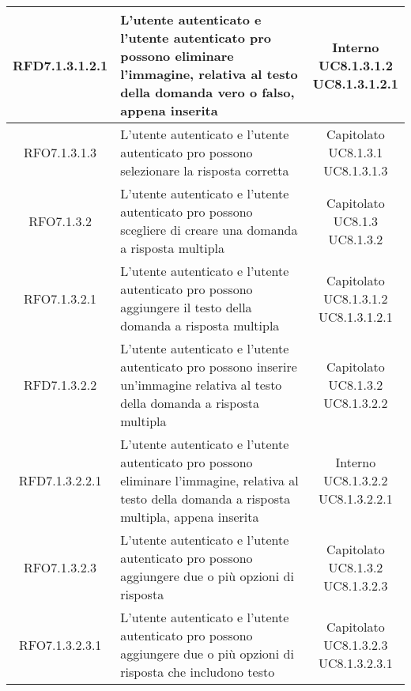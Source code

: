 \begin{longtable}{|c|>{\centering}m{7cm}|c|}
			 \hypertarget{{RFD7.1.3.1.2.1}}{{RFD7.1.3.1.2.1}} & L’utente autenticato e l'utente autenticato pro possono eliminare l’immagine, relativa al testo della domanda vero o falso, appena inserita & \makecell{Interno\\ UC8.1.3.1.2 \\UC8.1.3.1.2.1 } \\ \hline
			 \hypertarget{{RFO7.1.3.1.3}}{{RFO7.1.3.1.3}} & L’utente autenticato e l'utente autenticato pro possono selezionare la risposta corretta  & \makecell{Capitolato\\ UC8.1.3.1 \\UC8.1.3.1.3 } \\ \hline
			 \hypertarget{{RFO7.1.3.2}}{{RFO7.1.3.2}} & L’utente autenticato e l’utente autenticato pro possono scegliere di creare una domanda a risposta multipla & \makecell{Capitolato\\ UC8.1.3 \\UC8.1.3.2 } \\ \hline
			 \hypertarget{{RFO7.1.3.2.1}}{{RFO7.1.3.2.1}} & L’utente autenticato e l'utente autenticato pro possono aggiungere il testo della domanda a risposta multipla  & \makecell{Capitolato\\ UC8.1.3.1.2 \\UC8.1.3.1.2.1 } \\ \hline
			 \hypertarget{{RFD7.1.3.2.2}}{{RFD7.1.3.2.2}} & L’utente autenticato e l'utente autenticato pro possono inserire un'immagine relativa al testo della domanda a risposta multipla  & \makecell{Capitolato\\ UC8.1.3.2 \\UC8.1.3.2.2 } \\ \hline
			 \hypertarget{{RFD7.1.3.2.2.1}}{{RFD7.1.3.2.2.1}} & L’utente autenticato e l'utente autenticato pro possono eliminare l’immagine, relativa al testo della domanda a risposta multipla, appena inserita & \makecell{Interno\\ UC8.1.3.2.2 \\UC8.1.3.2.2.1 } \\ \hline
			 \hypertarget{{RFO7.1.3.2.3}}{{RFO7.1.3.2.3}} & L’utente autenticato e l'utente autenticato pro possono aggiungere due o più opzioni di risposta & \makecell{Capitolato\\ UC8.1.3.2 \\UC8.1.3.2.3 } \\ \hline
			 \hypertarget{{RFO7.1.3.2.3.1}}{{RFO7.1.3.2.3.1}} & L’utente autenticato e l'utente autenticato pro possono aggiungere due o più opzioni di risposta che includono testo & \makecell{Capitolato\\ UC8.1.3.2.3 \\UC8.1.3.2.3.1 } \\ \hline

\end{longtable}
